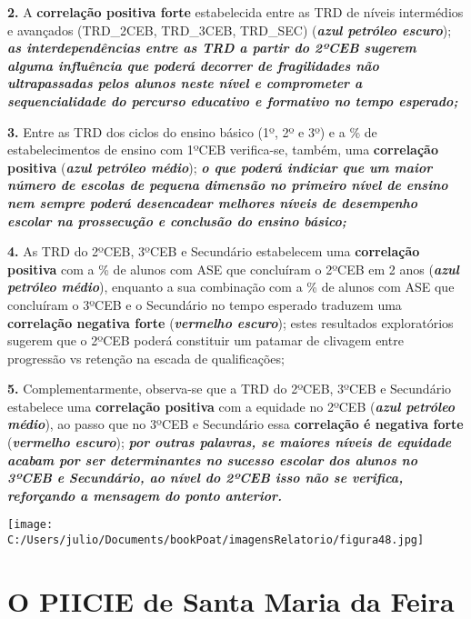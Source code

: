 \documentclass[
]{book}
\begin{document}
\textbf{2.} A \textbf{correlação positiva forte} estabelecida entre as TRD de níveis intermédios e avançados (TRD\_2CEB, TRD\_3CEB, TRD\_SEC) (\textbf{\emph{azul petróleo escuro}}); \textbf{\emph{as interdependências entre as TRD a partir do 2ºCEB sugerem alguma influência que poderá decorrer de fragilidades não ultrapassadas pelos alunos neste nível e comprometer a sequencialidade do percurso educativo e formativo no tempo esperado;}}

\textbf{3.} Entre as TRD dos ciclos do ensino básico (1º, 2º e 3º) e a \% de estabelecimentos de ensino com 1ºCEB verifica-se, também, uma \textbf{correlação positiva} (\textbf{\emph{azul petróleo médio}}); \textbf{\emph{o que poderá indiciar que um maior número de escolas de pequena dimensão no primeiro nível de ensino nem sempre poderá desencadear melhores níveis de desempenho escolar na prossecução e conclusão do ensino básico;}}

\textbf{4.} As TRD do 2ºCEB, 3ºCEB e Secundário estabelecem uma \textbf{correlação positiva} com a \% de alunos com ASE que concluíram o 2ºCEB em 2 anos (\textbf{\emph{azul petróleo médio}}), enquanto a sua combinação com a \% de alunos com ASE que concluíram o 3ºCEB e o Secundário no tempo esperado traduzem uma \textbf{correlação negativa forte} (\textbf{\emph{vermelho escuro}}); estes resultados exploratórios sugerem que o 2ºCEB poderá constituir um patamar de clivagem entre progressão vs retenção na escada de qualificações;

\textbf{5.} Complementarmente, observa-se que a TRD do 2ºCEB, 3ºCEB e Secundário estabelece uma \textbf{correlação positiva} com a equidade no 2ºCEB (\textbf{\emph{azul petróleo médio}}), ao passo que no 3ºCEB e Secundário essa \textbf{correlação é negativa forte} (\textbf{\emph{vermelho escuro}}); \textbf{\emph{por outras palavras, se maiores níveis de equidade acabam por ser determinantes no sucesso escolar dos alunos no 3ºCEB e Secundário, ao nível do 2ºCEB isso não se verifica, reforçando a mensagem do ponto anterior.}}

\texttt{[image: C:/Users/julio/Documents/bookPoat/imagensRelatorio/figura48.jpg]}

\hypertarget{o-piicie-de-santa-maria-da-feira}{%
\chapter{\texorpdfstring{\textbf{O PIICIE de Santa Maria da Feira}}{O PIICIE de Santa Maria da Feira}}\label{o-piicie-de-santa-maria-da-feira}}
\end{document}
